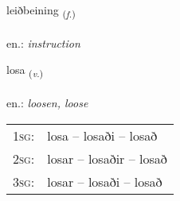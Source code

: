 \documentclass[frontgrid, backgrid]{flacards}\usepackage[]{graphicx}\usepackage[]{xcolor}
\begin{document}
\renewcommand{\flhead}{\vskip5pt \fboxsep=0pt {\small\bfseries\footnotesize Nafnorð | Noun}}
\renewcommand{\fcfoot}{\vskip5pt \fboxsep=0pt \hspace{2pt}{\small\bfseries\footnotesize 2K}}

\renewcommand{\blhead}{\vskip5pt {\small\bfseries\footnotesize Nafnorð | Noun }}
\renewcommand{\bcfoot}{\vskip5pt \hspace{2pt}{\small\bfseries\footnotesize 2K}}


{leiðbeining \small{\textsubscript{(\textit{f.})}} \\[1ex] %
\textphonetic{[leiðpeiniŋk]} \\
en.: \emph{instruction} \\  [2ex]
\renewcommand*{\arraystretch}{0.8}
}

\renewcommand{\flhead}{\vskip5pt \fboxsep=0pt {\small\bfseries\footnotesize Sagnorð | Verb}}
\renewcommand{\fcfoot}{\vskip5pt \fboxsep=0pt \hspace{2pt}{\small\bfseries\footnotesize 2K}}

\renewcommand{\blhead}{\vskip5pt {\small\bfseries\footnotesize Sagnorð | Verb }}
\renewcommand{\bcfoot}{\vskip5pt \hspace{2pt}{\small\bfseries\footnotesize 2K}}


{losa \small{\textsubscript{(\textit{v.})}} \\[1ex] %
\textphonetic{[lɔːsa]} \\
en.: \emph{loosen, loose} \\  [2ex]
\renewcommand*{\arraystretch}{0.8}
\begin{tabular}{p{1cm}l}
\textsc{1sg}: & losa -- losaði -- losað \\ 
\textsc{2sg}: & losar -- losaðir -- losað \\ 
\textsc{3sg}: & losar -- losaði -- losað \\ 
\end{tabular}
}
\end{document}
